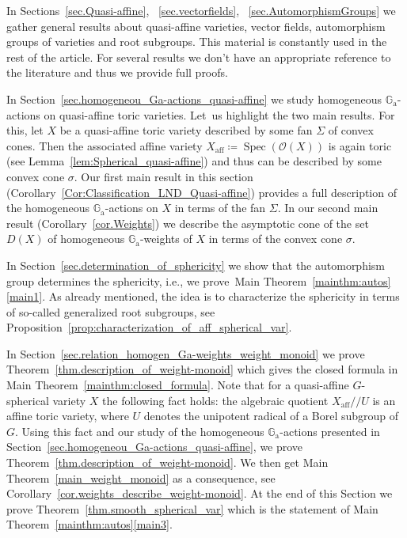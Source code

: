 \documentclass[11pt]{article}
\newcommand{\ie}{i.e.,\xspace}
\numberwithin{equation}{section}
\let\mathcal\mathscr
\newcommand{\ra}{\mathrm{a}}
\theoremstyle{plain}
\theoremstyle{definition}
\DeclareMathOperator{\Spec}{Spec}
\DeclareMathOperator{\aff}{aff}
\newcommand{\OO}{\mathcal{O}}
\newcommand{\GG}{\mathbb{G}}
\newcommand{\aquot}{/ \! \! /}
\begin{document}
In Sections~\ref{sec.Quasi-affine}, ~\ref{sec.vectorfields}, ~\ref{sec.AutomorphismGroups}
we gather general results about quasi-affine varieties,
vector fields, automorphism groups of varieties and root subgroups.
This material is constantly used in the rest of the article.
For several results we don't have an appropriate reference to the literature and
thus we provide full proofs.

In Section~\ref{sec.homogeneou_Ga-actions_quasi-affine} we study homogeneous $\GG_\ra$-actions
on quasi-affine toric varieties. Let~us highlight the two main results. For this, let
$X$ be a quasi-affine toric variety described by some fan $\Sigma$ of convex cones.
Then the associated affine variety $X_{\aff} \coloneqq \Spec(\OO(X))$
is again toric (see Lemma~\ref{lem:Spherical_quasi-affine}) and thus can
be described by some convex cone $\sigma$.
Our first main result in this section (Corollary~\ref{Cor:Classification_LND_Quasi-affine})
provides
a full description of the homogeneous $\GG_\ra$-actions on $X$ in terms of the fan $\Sigma$.
In our second main result (Corollary~\ref{cor.Weights})
we describe the asymptotic cone of the set $D(X)$
of homogeneous $\GG_\ra$-weights of $X$ in terms of the convex cone $\sigma$.

In Section~\ref{sec.determination_of_sphericity} we show that the automorphism
group determines the sphericity, \ie we prove~Main Theorem~\ref{mainthm:autos}\eqref{main1}.
As already mentioned, the idea is to characterize the sphericity in terms of so-called
generalized root subgroups, see Proposition~\ref{prop:characterization_of_aff_spherical_var}.

In Section~\ref{sec.relation_homogen_Ga-weights_weight_monoid} we prove
Theorem~\ref{thm.description_of_weight-monoid} which gives the closed formula
in Main Theorem~\ref{mainthm:closed_formula}. Note that
for a quasi-affine $G$-spherical variety $X$ the following fact holds:
the algebraic quotient $X_{\aff} \aquot U$ is an affine toric variety, where $U$ denotes
the unipotent radical of a Borel subgroup of $G$. Using this fact
and our study of the
homogeneous $\GG_\ra$-actions presented in Section~\ref{sec.homogeneou_Ga-actions_quasi-affine},
we prove Theorem~\ref{thm.description_of_weight-monoid}. We then get
Main Theorem~\ref{main_weight_monoid} as a consequence, see Corollary~\ref{cor.weights_describe_weight-monoid}. At the end of this Section we prove
Theorem~\ref{thm.smooth_spherical_var} which is the statement of Main Theorem~\ref{mainthm:autos}\eqref{main3}.
\end{document}
